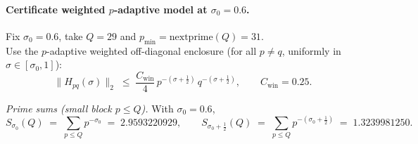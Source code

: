 \documentclass[11pt]{article}
\theoremstyle{definition}
\theoremstyle{remark}
\begin{document}




















\vspace{1.0cm}
\paragraph*{Certificate \textemdash{} weighted \(p\)-adaptive model at \(\sigma_0=0.6\).}
Fix \(\sigma_0=0.6\), take \(Q=29\) and \(p_{\min}=\mathrm{nextprime}(Q)=31\).\\
Use the \(p\)-adaptive weighted off-diagonal enclosure (for all \(p\neq q\), uniformly in \(\sigma\in[\sigma_0,1]\)):
\[
\|H_{pq}(\sigma)\|_2 \;\le\; \frac{C_{\mathrm{win}}}{4}\, p^{-(\sigma+\tfrac12)}\, q^{-(\sigma+\tfrac12)},
\qquad C_{\mathrm{win}}=0.25.
\]

\noindent\emph{Prime sums (small block \(p\le Q\)).} With \(\sigma_0=0.6\),
\[
S_{\sigma_0}(Q)\;=\;\sum_{p\le Q} p^{-\sigma_0}\;=\;2.9593220929,\qquad
S_{\sigma_0+\tfrac12}(Q)\;=\;\sum_{p\le Q} p^{-(\sigma_0+\tfrac12)}\;=\;1.3239981250.
\]
\end{document}

